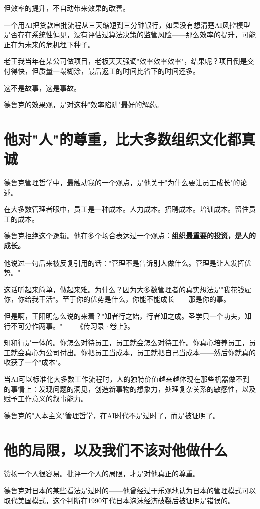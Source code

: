 但效率的提升，不自动带来效果的改善。

一个用AI把贷款审批流程从三天缩短到三分钟银行，如果没有想清楚AI风控模型是否存在系统性偏见，没有评估过算法决策的监管风险——那么效率的提升，可能正在为未来的危机埋下种子。

老王我当年在某公司做项目，老板天天强调"效率效率效率"，结果呢？项目倒是交付得快，但质量一塌糊涂，最后返工的时间比省下的时间还多。

这不是故事，这是事故。

德鲁克的效果观，是对这种"效率陷阱"最好的解药。


\section{他对"人"的尊重，比大多数组织文化都真诚}


德鲁克管理哲学中，最触动我的一个观点，是他关于"为什么要让员工成长"的论述。

在大多数管理者眼中，员工是一种成本。人力成本。招聘成本。培训成本。留住员工的成本。

德鲁克拒绝这个逻辑。他在多个场合表达过一个观点：\textbf{组织最重要的投资，是人的成长。}

他说过一句后来被反复引用的话："管理不是告诉别人做什么。管理是让人发挥优势。"

这话听起来简单，做起来难。为什么？因为大多数管理者的真实想法是"我花钱雇你，你给我干活"。至于你的优势是什么，你能不能成长——那是你的事。

但是啊，王阳明怎么说的来着？"知者行之始，行者知之成。圣学只一个功夫，知行不可分作两事。"——《传习录·卷上》。

知和行是一体的。你怎么对待员工，员工就会怎么对待工作。你真心培养员工，员工就会真心为公司付出。你把员工当成本，员工就把自己当成本——然后你就真的收获了一个"成本"。

当AI可以标准化大多数工作流程时，人的独特价值越来越体现在那些机器做不到的事情上：发现问题的洞见，创造新事物的想象力，处理复杂关系的敏感性，以及赋予工作意义的叙事能力。

德鲁克的"人本主义"管理哲学，在AI时代不是过时了，而是被证明了。


\section{他的局限，以及我们不该对他做什么}


赞扬一个人很容易。批评一个人的局限，才是对他真正的尊重。

德鲁克对日本的某些看法是过时的——他曾经过于乐观地认为日本的管理模式可以取代美国模式，这个判断在1990年代日本泡沫经济破裂后被证明是错误的。

